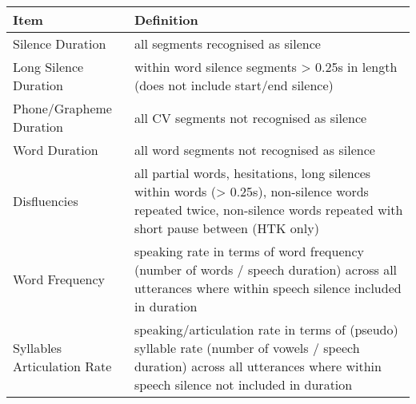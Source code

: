 \begin{table}[H]
    \centering
    \renewcommand{\arraystretch}{1.3}
    \begin{tabular}{|>{\raggedright\arraybackslash}p{4cm}|>{\raggedright\arraybackslash}p{10cm}|}
        \hline
        \textbf{Item}               & \textbf{Definition}                                                                                                                                                                                                                  \\
        \hline
        Silence Duration            & all segments recognised as silence                                                                                                                                                                                                   \\
        \hline
        Long Silence Duration       & within word silence segments > 0.25s in length (does not include start/end silence)                                                                                                                                                  \\
        \hline
        Phone/Grapheme Duration     & all CV segments not recognised as silence                                                                                                                                                                                            \\
        \hline
        Word Duration               & all word segments not recognised as silence                                                                                                                                                                                          \\
        \hline
        Disfluencies                & all partial words, hesitations, long silences within words (> 0.25s), non-silence words repeated twice, non-silence words repeated with short pause between (HTK only)                                                               \\
        \hline
        Word Frequency              & speaking rate in terms of word frequency (number of words / speech duration) across all utterances where within speech silence included in duration                                                                                  \\
        \hline
        Syllables Articulation Rate & speaking/articulation rate in terms of (pseudo) syllable rate (number of vowels / speech duration) across all utterances where within speech silence not included in duration                                                        \\

\end{tabular}
\end{table}
